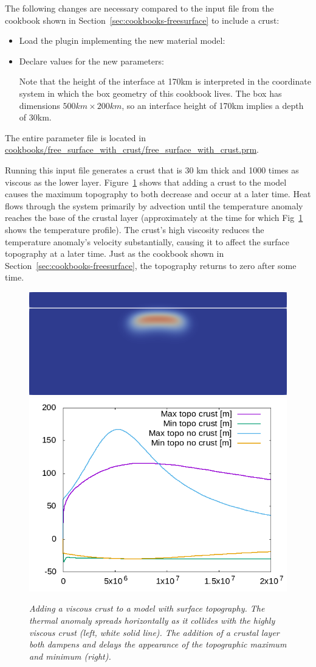 The following changes are necessary compared to the input file from the
cookbook shown in Section~\ref{sec:cookbooks-freesurface} to include a crust:
\begin{itemize}
  \item Load the plugin implementing the new material model:
  
  
  \item Declare values for the new parameters:
  
  Note that the height of the interface at 170km is interpreted in the
  coordinate system in which the box geometry of this cookbook lives. The box
  has dimensions $500\si{km}\times 200\si{km}$, so an interface height of
  170km implies a depth of 30km.
\end{itemize}

The entire parameter file is located in
\url{cookbooks/free_surface_with_crust/free_surface_with_crust.prm}.

Running this input file generates a
crust that is 30 km thick and 1000 times as viscous as the lower layer.
Figure~\ref{fig:freesurfaceWC} shows that adding a crust to the model causes the maximum topography to both decrease and occur at a later time.
Heat flows through the system primarily by advection until the temperature anomaly reaches the base of the
crustal layer (approximately at the time for which Fig~\ref{fig:freesurfaceWC}
shows the temperature profile).
The crust's high viscosity reduces the temperature anomaly's velocity
substantially, causing it to affect the surface topography at a later time. Just
as the cookbook shown in Section~\ref{sec:cookbooks-freesurface}, the
topography returns to zero after some time.

\begin{figure}
  \centering
  \includegraphics[height=0.25\textwidth]{cookbooks/free_surface_with_crust/doc/free_surface_with_crust.png}
  \hfill
  \includegraphics[height=0.25\textwidth]{cookbooks/free_surface_with_crust/doc/topography.png}
  \caption{\it Adding a viscous crust to a model with surface topography. The
  thermal anomaly spreads horizontally as it collides with the highly viscous crust (left, white solid line). The addition of a crustal layer both dampens and delays the appearance of the topographic maximum and minimum (right).}
  \label{fig:freesurfaceWC}
\end{figure}